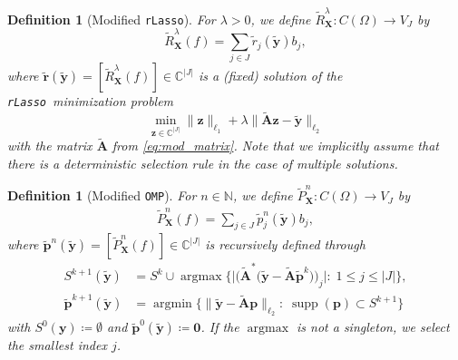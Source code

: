 \documentclass[11pt,reqno, a4paper]{article}
\numberwithin{equation}{section}
\newtheorem{definition}[theorem]{Definition}
\newcommand{\rlasso}{\texttt{rLasso}}
\newcommand{\omp}{\texttt{OMP}}
\DeclareMathOperator{\supp}{supp}
\DeclareMathOperator*{\argmax}{argmax}
\begin{document}
\begin{definition}[Modified \rlasso]\label{def:mod_square_root_lasso}
For $\lambda>0$, we define $\tilde{R}_{\mathbf{X}}^\lambda\colon C(\Omega) \to V_J$ by
\begin{equation}\label{eq:mod_Lasso_Decoder}
	\tilde{R}_{\mathbf{X}}^\lambda(f) = \sum_{j \in J} \tilde{r}_j(\tilde{\mathbf{y}}) b_j,
\end{equation}
where $\tilde{\mathbf{r}}(\tilde{\mathbf{y}}) = [\tilde{R}_{\mathbf{X}}^\lambda(f)] \in \mathbb{C}^{\lvert J\rvert}$ is a (fixed) solution of the \rlasso \ minimization problem
\begin{equation}\label{eq:mod_MinimizationProblem}
	\min_{\mathbf{z} \in \mathbb{C}^{\lvert J\rvert}} \lVert\mathbf{z}\rVert_{\ell_1} + \lambda \bigl\lVert\tilde{\mathbf{A}} \mathbf{z} - \tilde{\mathbf{y}}\bigr\rVert_{\ell_2}
\end{equation}
with the matrix $\tilde{\mathbf{A}}$ from \eqref{eq:mod_matrix}.
Note that we implicitly assume that there is a deterministic selection rule in the case of multiple solutions.
\end{definition}

\begin{definition}[Modified \omp]\label{def:mod_OMP} 	
For $n\in \mathbb{N}$, we define $\tilde{P}_{\mathbf{X}}^n\colon C(\Omega) \to V_J$ by
\begin{gather}\label{eq:mod_OMP_Decoder}
    \tilde{P}_{\mathbf{X}}^{n}(f) = \sum_{j \in J} \tilde{p}_j^n(\tilde{\mathbf{y}}) b_j,
\end{gather}
where $\tilde{\mathbf{p}}^n(\tilde{\mathbf{y}}) =[\tilde{P}_{\mathbf{X}}^n(f)]\in\mathbb{C}^{\lvert J\rvert}$ is recursively defined through
\begin{align}
    S^{k+1}(\tilde{\mathbf{y}}) & = S^k \cup \operatorname{argmax} \bigl\{\bigl\lvert\bigl(\tilde{\mathbf{A}}^\ast \bigl(\tilde{\mathbf{y}} - \tilde{\mathbf{A}}\tilde{\mathbf{p}}^k\bigr)\bigr)_j\bigr\rvert\colon \;  1 \leq j \leq \lvert J\rvert\bigr\},\label{eq:mod_OMP_iteration1}\\
    \tilde{\mathbf{p}}^{k+1}(\tilde{\mathbf{y}}) & = \operatorname{argmin}\big\{\lVert \tilde{\mathbf{y}} - \tilde{\mathbf{A}}\mathbf{p}\rVert_{\ell_2}\colon \; \supp(\mathbf{p}) \subset S^{k+1}\big\}\label{eq:mod_OMP_iteration2}
\end{align}
with $S^0(\mathbf{y}) \coloneqq \emptyset$ and $\tilde{\mathbf{p}}^0(\tilde{\mathbf{y}}) \coloneqq \mathbf{0}$. If the $\argmax$ is not a singleton, we select the smallest index $j$.
\end{definition}
\end{document}
